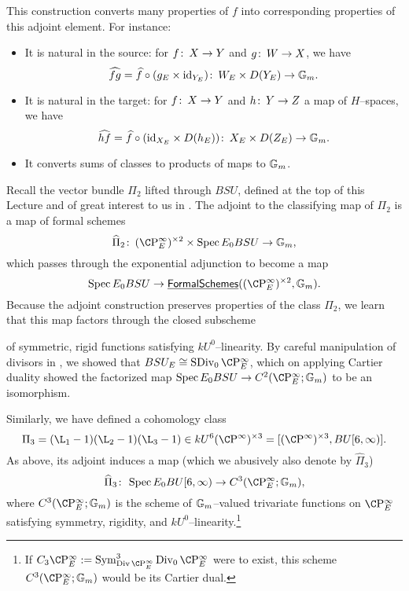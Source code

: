 \begin{remark}
This construction converts many properties of $f$ into corresponding properties of this adjoint element.  For instance:
\begin{itemize}
    \item It is natural in the source: for $f\colon\thinspace X \to Y$ and $g\colon\thinspace W \to X$, we have \[\widehat{fg} = \widehat{f} \circ (g_E \times \mathrm{id}_{Y_E})\colon\thinspace W_E \times D(Y_E) \to \mathbb G_m.\]
    \item It is natural in the target: for $f\colon\thinspace X \to Y$ and $h\colon\thinspace Y \to Z$ a map of $H$--spaces, we have \[\widehat{hf} = \widehat{f} \circ (\mathrm{id}_{X_E} \times D(h_E))\colon\thinspace X_E \times D(Z_E) \to \mathbb G_m.\]
    \item It converts sums of classes to products of maps to $\mathbb G_m$.
\end{itemize}
\end{remark}

\begin{example}\label{AdjointBSUExample}
Recall the vector bundle $\Pi_2$ lifted through $BSU$, defined at the top of this Lecture and of great interest to us in .  The adjoint to the classifying map of $\Pi_2$ is a map of formal schemes \[\widehat \Pi_2\co (\CP^\infty_E)^{\times 2} \times \Spec E_0 BSU \to \Gm,\] which passes through the exponential adjunction to become a map \[\Spec E_0 BSU \to \InternalHom{FormalSchemes}((\CP^\infty_E)^{\times 2}, \Gm).\]  Because the adjoint construction preserves properties of the class $\Pi_2$, we learn that this map factors through the closed subscheme
\begin{center}
\end{center}
of symmetric, rigid functions satisfying $kU^0$--linearity.  By careful manipulation of divisors in , we showed that $BSU_E \cong \SDiv_0 \CP^\infty_E$, which on applying Cartier duality showed the factorized map $\Spec E_0 BSU \to C^2(\CP^\infty_E; \Gm)$ to be an isomorphism.
\end{example}

\begin{example}
Similarly, we have defined a cohomology class \[\Pi_3 = (\L_1 - 1)(\L_2 - 1)(\L_3 - 1) \in kU^6(\CP^\infty)^{\times 3} = [(\CP^\infty)^{\times 3}, BU[6, \infty)].\]  As above, its adjoint induces a map (which we abusively also denote by $\widehat \Pi_3$) \[\widehat \Pi_3\co \Spec E_0 BU[6, \infty) \to C^3(\CP^\infty_E; \Gm),\] where $C^3(\CP^\infty_E; \Gm)$ is the scheme of $\mathbb G_m$--valued trivariate functions on $\CP^\infty_E$ satisfying symmetry, rigidity, and $kU^0$--linearity.\footnote{If $C_3 \CP^\infty_E := \Sym^3_{\Div \CP^\infty_E} \Div_0 \CP^\infty_E$ were to exist, this scheme $C^3(\CP^\infty_E; \Gm)$ would be its Cartier dual.}
\end{example}

